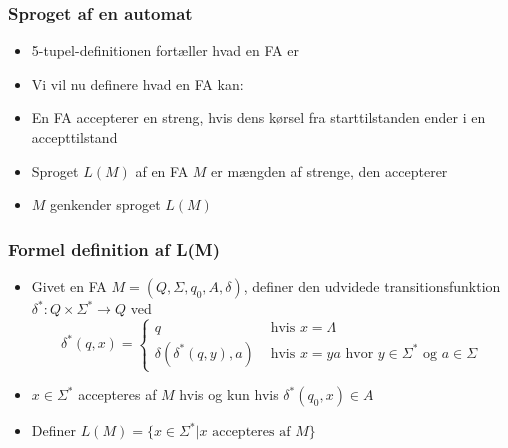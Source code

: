 \documentclass[]{beamer}
\begin{document}
\begin{frame}
  \frametitle{Sproget af en automat}
\begin{itemize}
\item 5-tupel-definitionen fortæller hvad en FA er
\item Vi vil nu definere hvad en FA kan:
\item En FA accepterer en streng, hvis dens kørsel fra
starttilstanden ender i en accepttilstand
\item Sproget $L(M)$ af en FA $M$ er mængden af strenge, den
accepterer
\item $M$ genkender sproget $L(M)$
  \end{itemize}
\end{frame}

\begin{frame}
  \frametitle{Formel definition af L(M)}
  \begin{itemize}[<+->]
  \item  Givet en FA $M=(Q, Σ, q_0, A, δ)$, definer
den udvidede transitionsfunktion $δ^*: Q×Σ^*→Q$
ved
\[δ^*(q, x) = \begin{cases}
 q &\text{ hvis }x=Λ\\
 δ(δ^*(q, y), a)  & \text{ hvis } x=ya \text{ hvor } y∈Σ^*\text{ og } a∈Σ
\end{cases}
\]
\item $x∈Σ^*$ accepteres af $M$ hvis og kun hvis $δ^*(q_0, x)∈A$
\item Definer $L(M) = \{ x ∈ Σ^* | x\text{ accepteres af }M \}$
  \end{itemize}
\end{frame}
\end{document}
